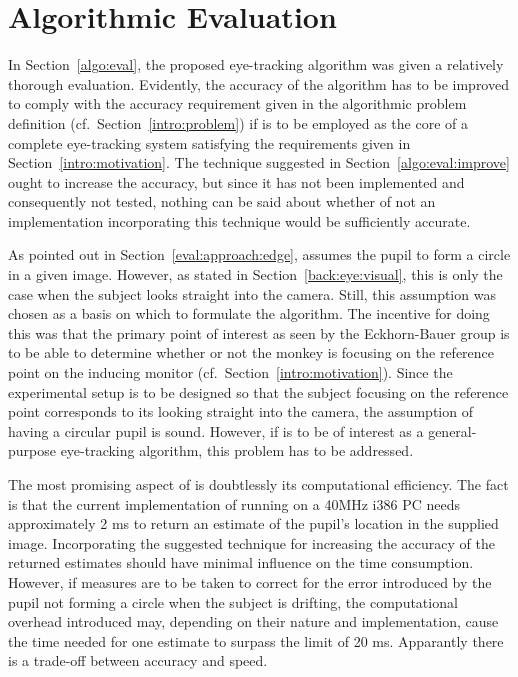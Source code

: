 
\section{Algorithmic Evaluation}
\label{concl:algo}

In Section~\ref{algo:eval}, the proposed eye-tracking algorithm
{\octopus} was given a relatively thorough evaluation.  Evidently, the
accuracy of the algorithm has to be improved to comply with the
accuracy requirement given in the algorithmic problem definition (cf.\ 
Section~\ref{intro:problem}) if {\octopus} is to be employed as the
core of a complete eye-tracking system satisfying the requirements
given in Section~\ref{intro:motivation}.  The technique suggested in
Section~\ref{algo:eval:improve} ought to increase the accuracy, but
since it has not been implemented and consequently not tested, nothing
can be said about whether of not an implementation incorporating this
technique would be sufficiently accurate.

As pointed out in Section~\ref{eval:approach:edge}, {\octopus} assumes
the pupil to form a circle in a given image.  However, as stated in
Section~\ref{back:eye:visual}, this is only the case when the subject
looks straight into the camera.  Still, this assumption was chosen as
a basis on which to formulate the algorithm.  The incentive for doing
this was that the primary point of interest as seen by the
Eckhorn-Bauer group is to be able to determine whether or not the
monkey is focusing on the reference point on the inducing monitor
(cf.\ Section~\ref{intro:motivation}).  Since the experimental setup
is to be designed so that the subject focusing on the reference point
corresponds to its looking straight into the camera, the assumption of
having a circular pupil is sound.  However, if {\octopus} is to be of
interest as a general-purpose eye-tracking algorithm, this problem has
to be addressed.

The most promising aspect of {\octopus} is doubtlessly its
computational efficiency.  The fact is that the current implementation
of {\octopus} running on a 40MHz i386 PC needs approximately 2 ms to
return an estimate of the pupil's location in the supplied image.
Incorporating the suggested technique for increasing the accuracy of
the returned estimates should have minimal influence on the time
consumption.  However, if measures are to be taken to correct for the
error introduced by the pupil not forming a circle when the subject is
drifting, the computational overhead introduced may, depending on
their nature and implementation, cause the time needed for one
estimate to surpass the limit of 20 ms.  Apparantly there is a
trade-off between accuracy and speed.
